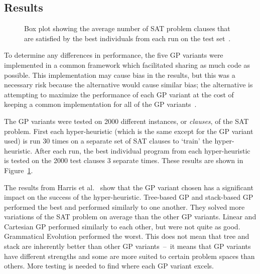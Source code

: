 \documentclass{sig-alternate}
\begin{document}
\subsection{Results}
\label{sec:gpresults}
\begin{figure}
	\centering
	\caption{Box plot showing the average number of SAT problem clauses that are satisfied by the best individuals from each run on the test set~\cite{harris:2015}.}
	\label{fig:gpvariants}
\end{figure}

To determine any differences in performance, the five GP variants were implemented in a common framework which facilitated sharing as much code as possible. This implementation may cause bias in the results, but this was a necessary risk because the alternative would cause similar bias; the alternative is attempting to maximize the performance of each GP variant at the cost of keeping a common implementation for all of the GP variants~\cite{harris:2015}.

The GP variants were tested on 2000 different instances, or \textit{clauses}, of the SAT problem. First each hyper-heuristic (which is the same except for the GP variant used) is run 30 times on a separate set of SAT clauses to `train' the hyper-heuristic. After each run, the best individual program from each hyper-heuristic is tested on the 2000 test clauses 3 separate times. These results are shown in Figure~\ref{fig:gpvariants}.

The results from Harris et al.~\cite{harris:2015} show that the GP variant chosen has a significant impact on the success of the hyper-heuristic. Tree-based GP and stack-based GP performed the best and performed similarly to one another. They solved more variations of the SAT problem on average than the other GP variants. Linear and Cartesian GP performed similarly to each other, but were not quite as good. Grammatical Evolution performed the worst. This does not mean that tree and stack are inherently better than other GP variants~--~it means that GP variants have different strengths and some are more suited to certain problem spaces than others. More testing is needed to find where each GP variant excels.
\end{document}
